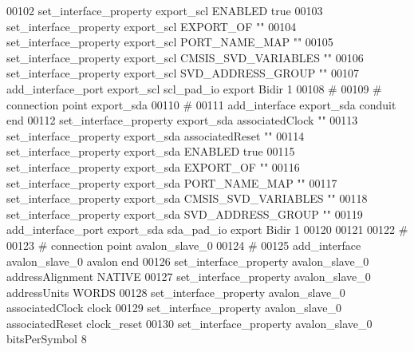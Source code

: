 \begin{DoxyCode}
00102 \textcolor{comment}{}  set\_interface\_property export\_scl ENABLED true\textcolor{comment}{}
00103 \textcolor{comment}{}  set\_interface\_property export\_scl EXPORT\_OF ""\textcolor{comment}{}
00104 \textcolor{comment}{}  set\_interface\_property export\_scl PORT\_NAME\_MAP ""\textcolor{comment}{}
00105 \textcolor{comment}{}  set\_interface\_property export\_scl CMSIS\_SVD\_VARIABLES ""\textcolor{comment}{}
00106 \textcolor{comment}{}  set\_interface\_property export\_scl SVD\_ADDRESS\_GROUP ""\textcolor{comment}{}
00107 \textcolor{comment}{}  add\_interface\_port export\_scl scl\_pad\_io export Bidir 1\textcolor{comment}{}
00108 \textcolor{comment}{}  \textcolor{comment}{# }
00109 \textcolor{comment}{}\textcolor{comment}{  }\textcolor{comment}{# connection point export\_sda}
00110 \textcolor{comment}{}\textcolor{comment}{  }\textcolor{comment}{# }
00111 \textcolor{comment}{}\textcolor{comment}{  }add\_interface export\_sda conduit end\textcolor{comment}{}
00112 \textcolor{comment}{}  set\_interface\_property export\_sda associatedClock ""\textcolor{comment}{}
00113 \textcolor{comment}{}  set\_interface\_property export\_sda associatedReset ""\textcolor{comment}{}
00114 \textcolor{comment}{}  set\_interface\_property export\_sda ENABLED true\textcolor{comment}{}
00115 \textcolor{comment}{}  set\_interface\_property export\_sda EXPORT\_OF ""\textcolor{comment}{}
00116 \textcolor{comment}{}  set\_interface\_property export\_sda PORT\_NAME\_MAP ""\textcolor{comment}{}
00117 \textcolor{comment}{}  set\_interface\_property export\_sda CMSIS\_SVD\_VARIABLES ""\textcolor{comment}{}
00118 \textcolor{comment}{}  set\_interface\_property export\_sda SVD\_ADDRESS\_GROUP ""\textcolor{comment}{}
00119 \textcolor{comment}{}  add\_interface\_port export\_sda sda\_pad\_io export Bidir 1\textcolor{comment}{}
00120 \textcolor{comment}{}
00121 
00122 \textcolor{comment}{# }
00123 \textcolor{comment}{}\textcolor{comment}{# connection point avalon\_slave\_0}
00124 \textcolor{comment}{}\textcolor{comment}{# }
00125 \textcolor{comment}{}add\_interface avalon\_slave\_0 avalon end\textcolor{comment}{}
00126 \textcolor{comment}{}set\_interface\_property avalon\_slave\_0 addressAlignment NATIVE\textcolor{comment}{}
00127 \textcolor{comment}{}set\_interface\_property avalon\_slave\_0 addressUnits WORDS\textcolor{comment}{}
00128 \textcolor{comment}{}set\_interface\_property avalon\_slave\_0 associatedClock clock\textcolor{comment}{}
00129 \textcolor{comment}{}set\_interface\_property avalon\_slave\_0 associatedReset clock\_reset\textcolor{comment}{}
00130 \textcolor{comment}{}set\_interface\_property avalon\_slave\_0 bitsPerSymbol 8\textcolor{comment}{}

\end{DoxyCode}
